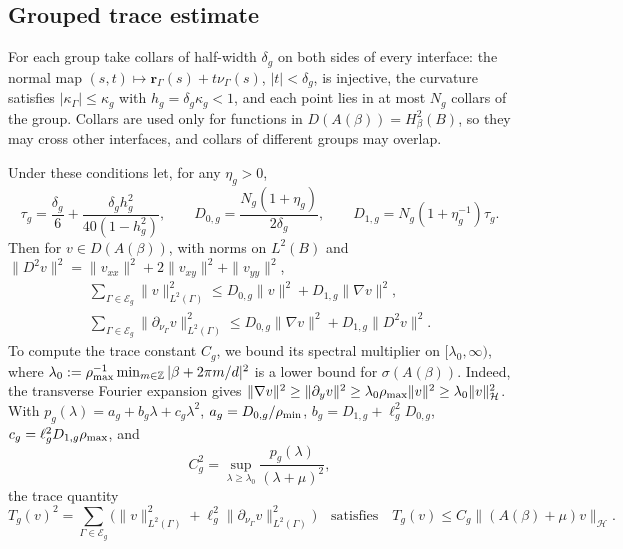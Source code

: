 \subsection{Grouped trace estimate}\label{sec:trace}
For each group take collars of half-width $\delta_g$ on both sides of every
interface: the normal map $(s,t)\mapsto\boldsymbol r_\Gamma(s)+t\nu_\Gamma(s)$,
$|t|<\delta_g$, is injective, the curvature satisfies $|\kappa_\Gamma|\le\kappa_g$
with $h_g=\delta_g\kappa_g<1$, and each point lies in at most $N_g$ collars of the
group. Collars are used only for functions in $D(A(\beta))=H^2_\beta(B)$, so they
may cross other interfaces, and collars of different groups may overlap.

\begin{proposition}\label{prop:trace}
Under these conditions let, for any $\eta_g>0$,
\[
  \tau_g=\frac{\delta_g}{6}+\frac{\delta_gh_g^2}{40(1-h_g^2)},\qquad
  D_{0,g}=\frac{N_g(1+\eta_g)}{2\delta_g},\qquad
  D_{1,g}=N_g(1+\eta_g^{-1})\tau_g .
\]
Then for $v\in D(A(\beta))$, with norms on $L^2(B)$ and
$\|D^2v\|^2=\|v_{xx}\|^2+2\|v_{xy}\|^2+\|v_{yy}\|^2$,
\begin{gather*}
  \sum_{\Gamma\in\mathscr E_g}\|v\|^2_{L^2(\Gamma)}\le D_{0,g}\|v\|^2+D_{1,g}\|\nabla v\|^2,\\
  \sum_{\Gamma\in\mathscr E_g}\|\partial_{\nu_\Gamma}v\|^2_{L^2(\Gamma)}\le D_{0,g}\|\nabla v\|^2
  +D_{1,g}\|D^2v\|^2 .
\end{gather*}
To compute the trace constant $C_g$, we bound its spectral multiplier on
$[\lambda_0,\infty)$, where $\lambda_0:=\rho_{\max}^{-1}\min_{m\in\mathbb{Z}}|\beta+2\pi m/d|^2$
is a lower bound for $\sigma(A(\beta))$. Indeed, the transverse Fourier
expansion gives $\|\nabla v\|^2\ge\|\partial_y v\|^2
\ge\lambda_0\rho_{\max}\|v\|^2\ge\lambda_0\|v\|_{\mathcal H}^2$.
With $p_g(\lambda)=a_g+b_g\lambda+c_g\lambda^2$, $a_g=D_{0,g}/\rho_{\min}$,
$b_g=D_{1,g}+\ell_g^2D_{0,g}$, $c_g=\ell_g^2D_{1,g}\rho_{\max}$, and
\begin{equation}\label{eq:Cg}
  C_g^2=\sup_{\lambda\ge\lambda_0}\frac{p_g(\lambda)}{(\lambda+\mu)^2},
\end{equation}
the trace quantity
\[
  T_g(v)^2=\sum_{\Gamma\in\mathscr E_g}\bigl(\|v\|^2_{L^2(\Gamma)}
  +\ell_g^2\|\partial_{\nu_\Gamma}v\|^2_{L^2(\Gamma)}\bigr)
  \quad\text{satisfies}\quad T_g(v)\le C_g\|(A(\beta)+\mu)v\|_{\mathcal H}.
\]
\end{proposition}

